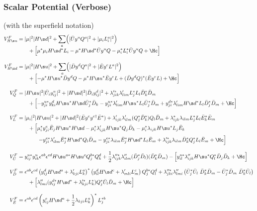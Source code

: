 \subsubsection{Scalar Potential (Verbose)}
(with the superfield notation)
\begin{align}
 V^F_{\Hu}&=
 |\mu|^2|\Hd|^2+\sum_a\Bigl(|\bU y^u Q^a|^2+|\mu_iL_i^a|^2\Bigr)
\\[-6pt]&\qquad\notag
+\Bigl[
 \mu^*\mu_i\Hd^*L_i - \mu^*\Hd^*\bU y^u Q - \mu_i^*L_i^*\bU y^u Q+\Hc
\Bigr]\\[8pt]
 V^F_{\Hd}&=
 |\mu|^2|\Hu|^2+\sum_a\Bigl(|\bD y^dQ^a|^2+|\bE y^e L^a|^2\Bigr)
\\[-6pt]&\qquad\notag
+\Bigl[
 -\mu^*\Hu^*\bD y^d Q-\mu^*\Hu^* \bE y^e L+(\bD y^d Q)^*(\bE y^e L)+\Hc
\Bigr]\\[8pt]
 V^F_{Q}&=
 |\Hu|^2|\bU_iy^u_{ij}|^2
+|\Hd|^2|\bD_iy^d_{ij}|^2
+\lambda'^*_{jik}\lambda'_{lim}L^*_jL_l\bD_k^*\bD_m
\\&\qquad\notag
+\Bigl[
-y^{u*}_{ji}y^d_{ki} \Hu^*\Hd\bU_j^*\bD_k
-y^{u*}_{ji}\lambda'_{lim}\Hu^*L_l\bU^*_j\bD_m
+y^{d*}_{ji}\lambda'_{lim}\Hd^*L_l\bD^*_j\bD_m+\Hc
\Bigr]\\[8pt]
 V^F_{L}&=
|\mu_i|^2|\Hu|^2+|\Hd|^2(\bE y^e y^{e\dagger}\bE^*)+\lambda'_{ijk}\lambda'_{ilm}(Q_j^*\bD^*_k)Q_l\bD_m
+\lambda^*_{ijk}\lambda_{ilm}L_j^*L_l\bE_k^*\bE_m
\notag\\&\qquad
+\Bigl[
\mu_i^*y^e_{ji}\bE_j\Hu^*\Hd-\mu^*_i\lambda'_{ijk}\Hu^*Q_j\bD_k-\mu_i^*\lambda_{ijk}\Hu^*L_j\bE_k
\Bigr.\\&\qquad\qquad\Bigl.\notag
-y^{e*}_{ji}\lambda'_{ilm}\bE^*_j\Hd^*Q_l\bD_m
-y^{e*}_{ji}\lambda_{ilm} \bE^*_j\Hd^*L_l\bE_m
+\lambda'^*_{ijk}\lambda_{ilm}\bD_k^*Q_j^*L_l\bE_m+\Hc
\Bigr]\\[8pt]
 V^F_{\bU}&=
 y^{u*}_{ij}y^u_{ik}\epsilon^{ab}\epsilon^{cd}H\s u^{a*}\Hu^cQ_j^{b*}Q_k^d
+\frac12\lambda''^*_{ijk}\lambda''_{ilm}(\bD^*_j\bD_l)(\bD^*_k\bD_m)
-\Bigl[y^{u*}_{il}\lambda''_{ijk}H\s u^*Q^*_l\bD_j\bD_k+\Hc\Bigr]\\[8pt]
 V^F_{\bD}&=
 \epsilon^{ab}\epsilon^{cd}
 \left(y^d_{ij}\Hd^a+\lambda'_{kji}L_k^a\right)^*\left(y^d_{il}\Hd^c+\lambda'_{mli}L^c_m\right)Q_j^{b*}Q_l^d
+\lambda''^*_{jki}\lambda''_{lmi}\left(\bU^*_j\bU_l\ \bD^*_k\bD_m-\bU^*_j\bD_m\ \bD^*_k\bU_l\right)
\notag\\&\qquad
+\Bigl[\lambda''_{lmi}(y^{d*}_{ij}\Hd^*+\lambda'^*_{kji}L_k^*)Q_j^*\bU_l\bD_m+\Hc\Bigr]\\[8pt]
 V^F_{\bE}&=
\epsilon^{ab}\epsilon^{cd}
\left(y^e_{ij}\Hd^a+\frac12\lambda_{kji}L_k^a\right)^*L^{*b}_j

\end{align}
